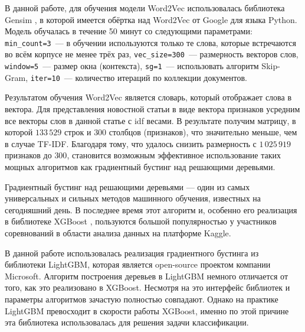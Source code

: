 \documentclass[a4paper, 14pt]{extarticle}
\begin{document}
В данной работе, для обучения модели Word2Vec использовалась библиотека Gensim \cite{rehurek_lrec}, в которой имеется обёртка над 
Word2Vec от Google  для языка Python. Модель обучалась в течение 50 минут со следующими параметрами: \verb|min_count=3|~--- в 
обучении используются только те слова,  которые встречаются во всём корпусе не менее трёх раз, \verb|vec_size=300|~--- размерность 
векторов слов, \verb|window=5|~--- размер окна (контекста), \verb|sg=1|~--- использовать алгоритм Skip-Gram, \verb|iter=10|~--- 
количество итераций по коллекции документов.

Результатом обучения Word2Vec является словарь, который отображает слова в вектора. Для представления новостной статьи в виде 
вектора признаков усредним все векторы слов в данной статье с idf весами. В результате получим матрицу, в которой $133\,529$ строк 
и $300$ столбцов (признаков), что значительно меньше, чем в случае TF-IDF. Благодаря тому, что удалось снизить размерность с 
$1\,025\,919$ признаков до $300$, становится возможным эффективное использование таких мощных алгоритмов как градиентный бустинг 
над решающими деревьями.

Градиентный бустинг над решающими деревьями --- один из самых универсальных и сильных методов машинного обучения, известных
на сегодняшний день. В последнее время этот алгоритм и, особенно его реализация в библиотеке XGBoost 
\cite{DBLP:journals/corr/ChenG16}, пользуются большой популярностью у участников соревнований в области анализа данных на платформе 
Kaggle.

В данной работе использовалась реализация градиентного бустинга из библиотеки LightGBM, которая является open-source проектом компании
Microsoft. Алгоритм построения деревьев в LightGBM немного отличается от того, как это реализовано в XGBoost. Несмотря на это интерфейс библиотек
и параметры алгоритмов зачастую полностью совпадают. Однако на практике LightGBM превосходит в скорости работы XGBoost, именно по этой причине
эта библиотека использовалась для решения задачи классификации.
\end{document}
